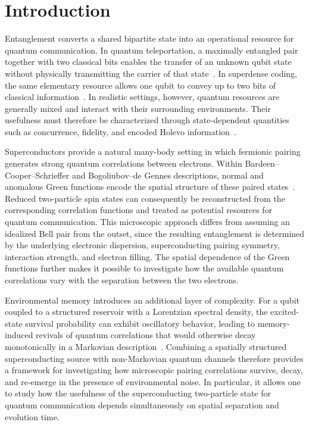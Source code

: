 \documentclass[aps,prb,twocolumn,superscriptaddress,longbibliography]{revtex4-2}
\begin{document}

\maketitle

\section{Introduction}

Entanglement converts a shared bipartite state into an operational resource for quantum communication. In quantum teleportation, a maximally entangled pair together with two classical bits enables the transfer of an unknown qubit state without physically transmitting the carrier of that state~\cite{Bennett1993}. In superdense coding, the same elementary resource allows one qubit to convey up to two bits of classical information~\cite{BennettWiesner1992}. In realistic settings, however, quantum resources are generally mixed and interact with their surrounding environments. Their usefulness must therefore be characterized through state-dependent quantities such as concurrence, fidelity, and encoded Holevo information~\cite{Wootters1998,Jozsa1994,Bruss2004}.

Superconductors provide a natural many-body setting in which fermionic pairing generates strong quantum correlations between electrons. Within Bardeen--Cooper--Schrieffer and Bogoliubov--de Gennes descriptions, normal and anomalous Green functions encode the spatial structure of these paired states~\cite{Oh2004,Oh2005}. Reduced two-particle spin states can consequently be reconstructed from the corresponding correlation functions and treated as potential resources for quantum communication. This microscopic approach differs from assuming an idealized Bell pair from the outset, since the resulting entanglement is determined by the underlying electronic dispersion, superconducting pairing symmetry, interaction strength, and electron filling. The spatial dependence of the Green functions further makes it possible to investigate how the available quantum correlations vary with the separation between the two electrons.

Environmental memory introduces an additional layer of complexity. For a qubit coupled to a structured reservoir with a Lorentzian spectral density, the excited-state survival probability can exhibit oscillatory behavior, leading to memory-induced revivals of quantum correlations that would otherwise decay monotonically in a Markovian description~\cite{Breuer2002,Bellomo2007}. Combining a spatially structured superconducting source with non-Markovian quantum channels therefore provides a framework for investigating how microscopic pairing correlations survive, decay, and re-emerge in the presence of environmental noise. In particular, it allows one to study how the usefulness of the superconducting two-particle state for quantum communication depends simultaneously on spatial separation and evolution time.
\end{document}
